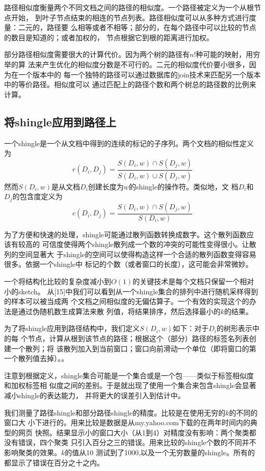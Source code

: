 路径相似度衡量两个不同文档之间的路径的相似度。一个路径被定义为一个从根节点开始，
到叶子节点结束的相连的节点列表。路径相似度可以从多种方式进行度量：二元的，路径要
么相等或者不相等；部分的，在每个路径中可以比较的节点的数目是知道的；或者加权的，
节点根据它到根的距离进行加权。

部分路径相似度需要很大的计算代价。因为两个树的路径有$n!$种可能的映射，用穷举的算
法来产生优化的相似度分数是不可行的。二元的相似度代价要小很多，因为在一个版本中的
每一个独特的路径可以通过数据库的join技术来匹配另一个版本中的等价路径。相似度可以
通过匹配上的路径个数和两个树总的路径数的比例来计算。

\subsection{将shingle应用到路径上}
一个shingle是一个从文档中得到的连续的标记的子序列。两个文档的相似性定义为
\[
r(D_i,D_j)=\frac{S(D_i,w)\cap S(D_j,w)}{S(D_i,w)\cup S(D_j,w)}
\]
然而$S(D_i,w)$是从文档$D_i$创建长度为$w$的shingle的操作符。类似地，文
档$D_i$和$D_j$的包含度定义为
\[
c(D_i,D_j)=\frac{S(D_i,w)\cap S(D_j,w)}{S(D_i,w)}
\]

为了方便和快速的处理，shingle可能通过散列函数转换成数字。这个散列函数应该有较高的
可信度使得两个shingle散列成一个数的冲突的可能性变得很小。让散列的空间显著大
于shingle的空间可以使得构造这样一个合适的散列函数变得容易很多。依据一个shingle中
标记的个数（或者窗口的长度），这可能会非常微妙。

一个将结构化比较的复杂度减小到$O(1)$的关键技术是每个文档只保留一个相对小的sketch。
从[15]中我们可以看到从一个shingle集合的排列中进行随机采样得到的样本可以被当成两
个文档之间相似度的无偏估算子。一个有效的实现这个的办法是通过伪随机数生成算法来散
列值，将结果排序，然后选择最小的$k$的结果。

为了将shingle应用到路径结构中，我们定义$S(D_i,w)$如下：对于$D_i$的树形表示中的每
个节点，计算从根到该节点的路径；根据这个（部分）路径的标签名列表创建一个散列；将
该散列加入到当前窗口；窗口向前滑动一个单位（即将窗口的第一个散列值去掉）。。

注意到根据定义，shingle集合可能是一个集合或是一个包——类似于标签相似度和加权标签相
似度之间的差别。于是就出现了使用一个集合来包含shingle会显著减小shingle的表达能力，
并将更大的误差引入到估计中。

我们测量了路径shingle和部分路径shingle的精度。比较是在使用无穷的$k$的不同的窗口大
小下进行的。用来比较是数据是从{my.yahoo.com}下载的在两年时间内的典型的网页
快照。结果显示小的窗口大小（从1到4）对精度没有影响：两个聚类都没有错误，四个聚类
只引入百分之三的错误。用来比较的shingle个数的不同并不影响聚类的效果。$k$的值从10
测试到了1000,以及一个无穷数量的shingle。所有的都显示了错误在百分之十之内。

